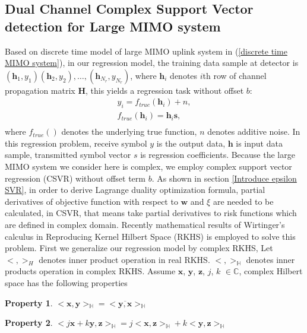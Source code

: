 \documentclass[12pt, draftclsnofoot, onecolumn]{IEEEtran}
\begin{document}
\begin{spacing}{2}
 
\section{Dual Channel Complex Support Vector detection for Large MIMO system}\label{dual channel CSVR}
 Based on discrete time model of large MIMO uplink system in (\ref{discrete time MIMO system}), in our  regression model, the training data sample at detector is $(\mathbf{h}_{1}, y_{1})(\mathbf{h}_{2}, y_{2}), \ldots, (\mathbf{h}_{N_{r}}, y_{N_{r}})$, where $\mathbf{h}_{i}$ denotes $i$th row of channel propagation matrix $\mathbf{H}$, this yields a regression task without offset $b$:  
 \begin{eqnarray}
 y_{i}=f_{true}(\mathbf{h}_{i})+n,\\
 \label{regression part1a}
 f_{true}(\mathbf{h}_{i})=\mathbf{h}_{i}\mathbf{s},\\
 \label{regression part1b}
 \end{eqnarray}
 where $f_{true}()$ denotes the underlying true function, $n$ denotes additive noise.
In this regression problem, receive symbol $y$ is the output data, $\mathbf{h}$ is input data sample, transmitted symbol vector $s$ is regression coefficients. Because the large MIMO system we consider here is complex, we employ complex support vector regression (CSVR) without offset term $b$. As shown in section \ref{Introduce epsilon SVR}, in order to derive Lagrange duality optimization formula, partial derivatives of objective function with respect to $\mathbf{w}$ and $\xi$ are needed to be calculated, in CSVR, that means take partial derivatives to risk functions which are defined in complex domain. Recently mathematical results of Wirtinger's calculus in Reproducing Kernel Hilbert Space (RKHS) is employed to solve this problem\cite{bouboulis2011extension}. First we generalize our regression model by complex RKHS, 
Let $<,>_{H}$ denotes inner product operation in real RKHS. $<,>_{\mathbb{H}}$ denotes inner products operation in complex RKHS. Assume $\mathbf{x}$, $\mathbf{y}$, $\mathbf{z}$, $j$, $k$ $\in \mathbb{C}$, complex Hilbert space has the following properties 
\newtheorem{Lemma}{Lemma}
\newtheorem{Property}{Property}
\begin{Property}
 $<\mathbf{x},\mathbf{y}>_{\mathbb{H}}=<\overline{\mathbf{y},\mathbf{x}}>_{\mathbb{H}}$
\label{CHSProperty1}
\end{Property}

\begin{Property}
$<j\mathbf{x}+k\mathbf{y},\mathbf{z}>_{\mathbb{H}}=j<\mathbf{x},\mathbf{z}>_{\mathbb{H}}+k<\mathbf{y},\mathbf{z}>_{\mathbb{H}}$
\label{CHSProperty2}
\end{Property}


\end{spacing}
\end{document}
